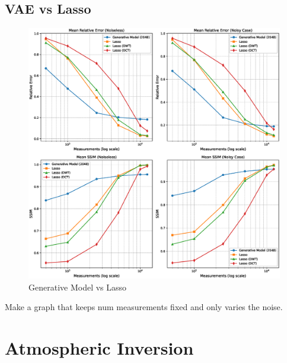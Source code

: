 \subsection{VAE vs Lasso}
\begin{figure}[h!]
    \centering
    \includegraphics[width=\textwidth]{figures/06_results/gen_vs_lasso.eps}
    \caption{Generative Model vs Lasso}
\end{figure}
Make a graph that keeps num measurements fixed and only varies the noise.

\section{Atmospheric Inversion}
